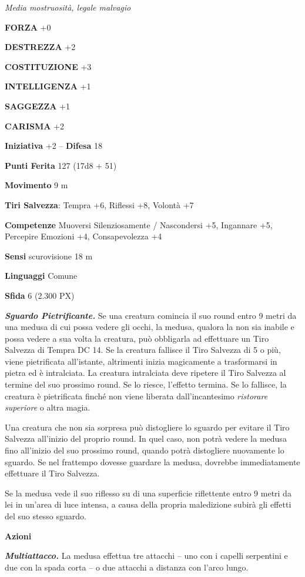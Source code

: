 \begin{multicols}{2}
	\textit{Media mostruosità, legale malvagio}

	\textbf{FORZA} +0

	\textbf{DESTREZZA} +2

	\textbf{COSTITUZIONE} +3

	\textbf{INTELLIGENZA} +1

	\textbf{SAGGEZZA} +1

	\textbf{CARISMA} +2

	\textbf{Iniziativa} +2 -- \textbf{Difesa} 18

	\textbf{Punti Ferita} 127 (17d8 + 51)

	\textbf{Movimento} 9 m

	\textbf{Tiri Salvezza}: Tempra +6, Riflessi +8, Volontà +7

	\textbf{Competenze} Muoversi Silenziosamente / Nascondersi +5, Ingannare +5, Percepire Emozioni +4, Consapevolezza +4

	\textbf{Sensi} scurovisione 18 m

	\textbf{Linguaggi} Comune

	\textbf{Sfida} 6 (2.300 PX)

	\textit{\textbf{Sguardo Pietrificante.}} Se una creatura comincia il suo round entro 9 metri da una medusa di cui possa vedere gli occhi, la medusa, qualora la non sia inabile e possa vedere a sua volta la creatura, può obbligarla ad effettuare un Tiro Salvezza di Tempra DC 14. Se la creatura fallisce il Tiro Salvezza di 5 o più, viene pietrificata all'istante, altrimenti inizia magicamente a trasformarsi in pietra ed è intralciata. La creatura intralciata deve ripetere il Tiro Salvezza al termine del suo prossimo round. Se lo riesce, l'effetto termina. Se lo fallisce, la creatura è pietrificata finché non viene liberata dall'incantesimo \textit{ristorare superiore} o altra magia.

	Una creatura che non sia sorpresa può distogliere lo sguardo per evitare il Tiro Salvezza all'inizio del proprio round. In quel caso, non potrà vedere la medusa fino all'inizio del suo prossimo round, quando potrà distogliere nuovamente lo sguardo. Se nel frattempo dovesse guardare la medusa, dovrebbe immediatamente effettuare il Tiro Salvezza.

	Se la medusa vede il suo riflesso su di una superficie riflettente entro 9 metri da lei in un'area di luce intensa, a causa della propria maledizione subirà gli effetti del suo stesso sguardo.

	\textbf{Azioni}

	\textit{\textbf{Multiattacco.}} La medusa effettua tre attacchi -- uno con i capelli serpentini e due con la spada corta -- o due attacchi a distanza con l'arco lungo.




\end{multicols}
